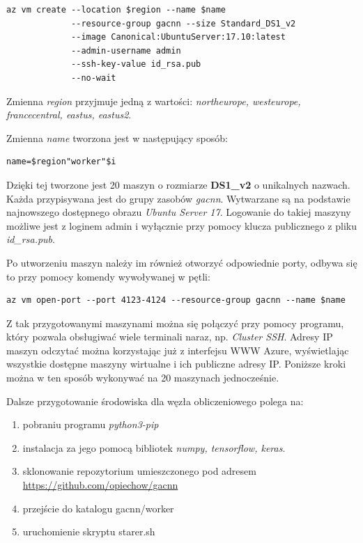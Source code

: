 \begin{lstlisting}
az vm create --location $region --name $name
             --resource-group gacnn --size Standard_DS1_v2
             --image Canonical:UbuntuServer:17.10:latest
             --admin-username admin
             --ssh-key-value id_rsa.pub
             --no-wait
\end{lstlisting}

Zmienna \textit{region} przyjmuje jedną z wartości: \textit{northeurope, westeurope, francecentral, eastus, eastus2}.

Zmienna \textit{name} tworzona jest w następujący sposób:

\begin{lstlisting}
name=$region"worker"$i
\end{lstlisting}

Dzięki tej tworzone jest 20 maszyn o rozmiarze \textbf{DS1\_v2} o unikalnych nazwach.
Każda przypisywana jest do grupy zasobów \textit{gacnn}.
Wytwarzane są na podstawie najnowszego dostępnego obrazu \textit{Ubuntu Server 17}.
Logowanie do takiej maszyny możliwe jest z loginem admin i wyłącznie przy pomocy klucza publicznego z pliku \textit{id\_rsa.pub}.

Po utworzeniu maszyn należy im również otworzyć odpowiednie porty, odbywa się to przy pomocy komendy wywoływanej w pętli:
\begin{lstlisting}
az vm open-port --port 4123-4124 --resource-group gacnn --name $name
\end{lstlisting}

Z tak przygotowanymi maszynami można się połączyć przy pomocy programu, który pozwala obsługiwać wiele terminali naraz, np. \textit{Cluster SSH}.
Adresy IP maszyn odczytać można korzystając już z interfejsu WWW Azure, wyświetlając wszystkie dostępne maszyny wirtualne i ich publiczne adresy IP.
Poniższe kroki można w ten sposób wykonywać na 20 maszynach jednocześnie.

Dalsze przygotowanie środowiska dla węzła obliczeniowego polega na:
\begin{enumerate}
  \item pobraniu programu \textit{python3-pip}
  \item instalacja za jego pomocą bibliotek \textit{numpy, tensorflow, keras}.
  \item sklonowanie repozytorium umieszczonego pod adresem \url{https://github.com/opiechow/gacnn}
  \item przejście do katalogu gacnn/worker
  \item uruchomienie skryptu starer.sh
\end{enumerate}


